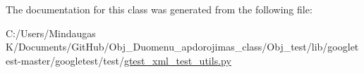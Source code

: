 The documentation for this class was generated from the following file\+:\begin{DoxyCompactItemize}
\item 
C\+:/\+Users/\+Mindaugas K/\+Documents/\+Git\+Hub/\+Obj\+\_\+\+Duomenu\+\_\+apdorojimas\+\_\+class/\+Obj\+\_\+test/lib/googletest-\/master/googletest/test/\mbox{\hyperlink{_obj__test_2lib_2googletest-master_2googletest_2test_2gtest__xml__test__utils_8py}{gtest\+\_\+xml\+\_\+test\+\_\+utils.\+py}}\end{DoxyCompactItemize}
